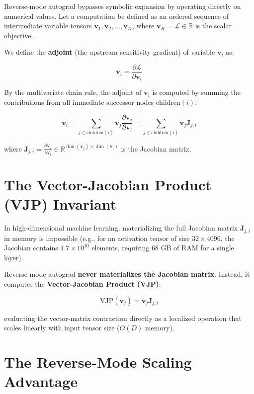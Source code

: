 \documentclass[
  letterpaper,
]{scrbook}
\begin{document}
Reverse-mode autograd bypasses symbolic expansion by operating directly
on numerical values. Let a computation be defined as an ordered sequence
of intermediate variable tensors
\(\mathbf{v}_1, \mathbf{v}_2, \dots, \mathbf{v}_K\), where
\(\mathbf{v}_K = \mathcal{L} \in \mathbb{R}\) is the scalar objective.

We define the \textbf{adjoint} (the upstream sensitivity gradient) of
variable \(\mathbf{v}_i\) as:

\[\overline{\mathbf{v}}_i = \frac{\partial \mathcal{L}}{\partial \mathbf{v}_i}\]

By the multivariate chain rule, the adjoint of \(\mathbf{v}_i\) is
computed by summing the contributions from all immediate successor nodes
\(\text{children}(i)\):

\[\overline{\mathbf{v}}_i = \sum_{j \in \text{children}(i)} \overline{\mathbf{v}}_j \frac{\partial \mathbf{v}_j}{\partial \mathbf{v}_i} = \sum_{j \in \text{children}(i)} \overline{\mathbf{v}}_j \mathbf{J}_{j,i}\]

where
\(\mathbf{J}_{j,i} = \frac{\partial \mathbf{v}_j}{\partial \mathbf{v}_i} \in \mathbb{R}^{\dim(\mathbf{v}_j) \times \dim(\mathbf{v}_i)}\)
is the Jacobian matrix.

\section{The Vector-Jacobian Product (VJP)
Invariant}\label{the-vector-jacobian-product-vjp-invariant}

In high-dimensional machine learning, materializing the full Jacobian
matrix \(\mathbf{J}_{j,i}\) in memory is impossible (e.g., for an
activation tensor of size \(32 \times 4096\), the Jacobian contains
\(1.7 \times 10^{10}\) elements, requiring \(68\text{ GB}\) of RAM for a
single layer).

Reverse-mode autograd \textbf{never materializes the Jacobian matrix}.
Instead, it computes the \textbf{Vector-Jacobian Product (VJP)}:

\[\text{VJP}(\overline{\mathbf{v}}_j) = \overline{\mathbf{v}}_j \mathbf{J}_{j,i}\]

evaluating the vector-matrix contraction directly as a localized
operation that scales linearly with input tensor size (\(O(D)\) memory).

\section{The Reverse-Mode Scaling
Advantage}\label{the-reverse-mode-scaling-advantage}
\end{document}
